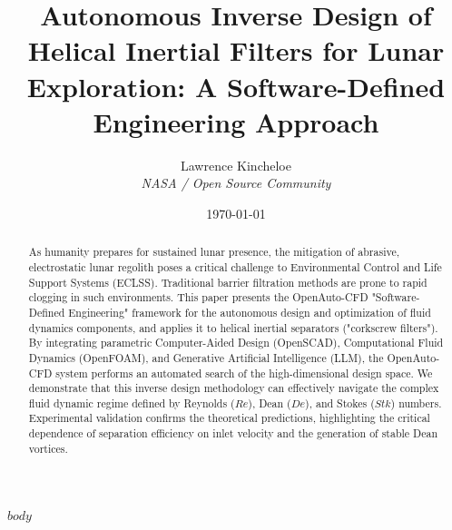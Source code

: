 \documentclass[twocolumn]{article}
\title{Autonomous Inverse Design of Helical Inertial Filters for Lunar Exploration: A Software-Defined Engineering Approach}
\author{Lawrence Kincheloe \\ \textit{NASA / Open Source Community}}
\date{\today}
\begin{document}
\maketitle

\begin{abstract}
As humanity prepares for sustained lunar presence, the mitigation of abrasive, electrostatic lunar regolith poses a critical challenge to Environmental Control and Life Support Systems (ECLSS). Traditional barrier filtration methods are prone to rapid clogging in such environments. This paper presents the OpenAuto-CFD "Software-Defined Engineering" framework for the autonomous design and optimization of fluid dynamics components, and applies it to helical inertial separators ("corkscrew filters"). By integrating parametric Computer-Aided Design (OpenSCAD), Computational Fluid Dynamics (OpenFOAM), and Generative Artificial Intelligence (LLM), the OpenAuto-CFD system performs an automated search of the high-dimensional design space. We demonstrate that this inverse design methodology can effectively navigate the complex fluid dynamic regime defined by Reynolds ($Re$), Dean ($De$), and Stokes ($Stk$) numbers. Experimental validation confirms the theoretical predictions, highlighting the critical dependence of separation efficiency on inlet velocity and the generation of stable Dean vortices.
\end{abstract}

$body$
\end{document}
